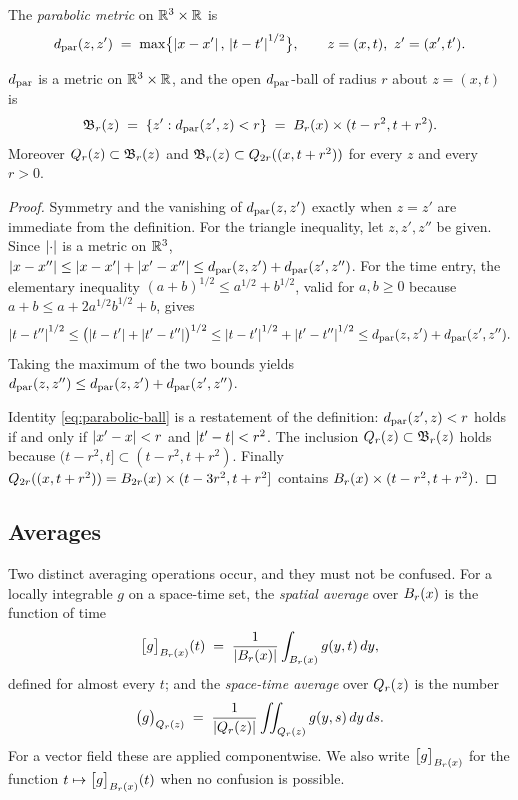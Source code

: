 \documentclass[11pt,reqno]{amsart}
\begin{document}
The \emph{parabolic metric} on $\mathbb{R}^{3}\times\mathbb{R}$ is
\begin{equation}\label{eq:parabolic-metric}
  d_{\mathrm{par}}(z,z') \;=\; \max\bigl\{\left\lvert x-x' \right\rvert,\,\left\lvert t-t' \right\rvert^{1/2}\bigr\},
  \qquad z=(x,t),\ z'=(x',t').
\end{equation}

\begin{lemma}\label{lem:parabolic-metric}
$d_{\mathrm{par}}$ is a metric on $\mathbb{R}^{3}\times\mathbb{R}$, and the open $d_{\mathrm{par}}$-ball of radius $r$
about $z=(x,t)$ is
\begin{equation}\label{eq:parabolic-ball}
  \mathfrak{B}_{r}(z)
  \;=\;\{z':d_{\mathrm{par}}(z',z)<r\}
  \;=\;B_{r}(x)\times(t-r^{2},t+r^{2}).
\end{equation}
Moreover $Q_{r}(z)\subset\mathfrak{B}_{r}(z)$ and
$\mathfrak{B}_{r}(z)\subset Q_{2r}((x,t+r^{2}))$ for every $z$ and every
$r>0$.
\end{lemma}

\begin{proof}
Symmetry and the vanishing of $d_{\mathrm{par}}(z,z')$ exactly when $z=z'$ are immediate
from the definition. For the triangle inequality, let $z,z',z''$ be given. Since
$\left\lvert \cdot \right\rvert$ is a metric on $\mathbb{R}^{3}$,
$\left\lvert x-x'' \right\rvert\le\left\lvert x-x' \right\rvert+\left\lvert x'-x'' \right\rvert\le d_{\mathrm{par}}(z,z')+d_{\mathrm{par}}(z',z'')$. For the
time entry, the elementary inequality $(a+b)^{1/2}\le a^{1/2}+b^{1/2}$, valid
for $a,b\ge0$ because $a+b\le a+2a^{1/2}b^{1/2}+b$, gives
\[
  \left\lvert t-t'' \right\rvert^{1/2}\le\bigl(\left\lvert t-t' \right\rvert+\left\lvert t'-t'' \right\rvert\bigr)^{1/2}
  \le\left\lvert t-t' \right\rvert^{1/2}+\left\lvert t'-t'' \right\rvert^{1/2}
  \le d_{\mathrm{par}}(z,z')+d_{\mathrm{par}}(z',z'').
\]
Taking the maximum of the two bounds yields
$d_{\mathrm{par}}(z,z'')\le d_{\mathrm{par}}(z,z')+d_{\mathrm{par}}(z',z'')$.

Identity \eqref{eq:parabolic-ball} is a restatement of the definition:
$d_{\mathrm{par}}(z',z)<r$ holds if and only if $\left\lvert x'-x \right\rvert<r$ and $\left\lvert t'-t \right\rvert<r^{2}$. The
inclusion $Q_{r}(z)\subset\mathfrak{B}_{r}(z)$ holds because
$(t-r^{2},t]\subset(t-r^{2},t+r^{2})$. Finally
$Q_{2r}((x,t+r^{2}))=B_{2r}(x)\times(t-3r^{2},t+r^{2}]$ contains
$B_{r}(x)\times(t-r^{2},t+r^{2})$.
\end{proof}

\subsection{Averages}\label{ss:averages}

Two distinct averaging operations occur, and they must not be confused. For a
locally integrable $g$ on a space-time set, the \emph{spatial average} over
$B_{r}(x)$ is the function of time
\begin{equation}\label{eq:spatial-average}
  \bigl[g\bigr]_{B_{r}(x)}(t)
  \;=\;\frac{1}{\left\lvert B_{r}(x) \right\rvert}\int_{B_{r}(x)}g(y,t)\,dy,
\end{equation}
defined for almost every $t$; and the \emph{space-time average} over
$Q_{r}(z)$ is the number
\begin{equation}\label{eq:spacetime-average}
  \bigl(g\bigr)_{Q_{r}(z)}
  \;=\;\frac{1}{\left\lvert Q_{r}(z) \right\rvert}\iint_{Q_{r}(z)}g(y,s)\,dy\,ds .
\end{equation}
For a vector field these are applied componentwise. We also write
$\bigl[g\bigr]_{B_{r}(x)}$ for the function $t\mapsto\bigl[g\bigr]_{B_{r}(x)}(t)$
when no confusion is possible.
\end{document}
